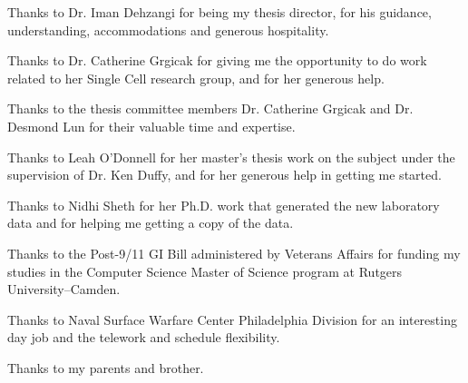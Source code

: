 
\begin{acknowledgments}

Thanks to Dr. Iman Dehzangi for being my thesis director, for his guidance, understanding, accommodations and generous hospitality.

Thanks to Dr. Catherine Grgicak for giving me the opportunity to do work related to her Single Cell research group, and for her generous help.

Thanks to the thesis committee members Dr. Catherine Grgicak and Dr. Desmond Lun for their valuable time and expertise.

Thanks to Leah O'Donnell for her master's thesis work on the subject under the supervision of Dr. Ken Duffy, and for her generous help in getting me started.

Thanks to Nidhi Sheth for her Ph.D. work that generated the new laboratory data and for helping me getting a copy of the data.

Thanks to the Post-9/11 GI Bill administered by Veterans Affairs for funding my studies in the Computer Science Master of Science program at Rutgers University--Camden.

Thanks to Naval Surface Warfare Center Philadelphia Division for an interesting day job and the telework and schedule flexibility.

Thanks to my parents and brother.

\end{acknowledgments}
